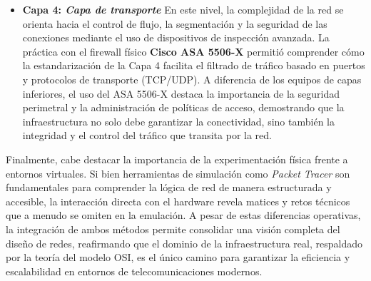 \begin{itemize}
\item \textbf{Capa 4: \textit{Capa de transporte}}
    \newline
    En este nivel, la complejidad de la red se orienta hacia el control de flujo, la segmentación y la seguridad de las conexiones mediante el uso de dispositivos de inspección avanzada. La práctica con el firewall físico \textbf{Cisco ASA 5506-X} permitió comprender cómo la estandarización de la Capa 4 facilita el filtrado de tráfico basado en puertos y protocolos de transporte (TCP/UDP). A diferencia de los equipos de capas inferiores, el uso del ASA 5506-X destaca la importancia de la seguridad perimetral y la administración de políticas de acceso, demostrando que la infraestructura no solo debe garantizar la conectividad, sino también la integridad y el control del tráfico que transita por la red.
\end{itemize}

\medskip
Finalmente, cabe destacar la importancia de la experimentación física frente a entornos virtuales. Si bien herramientas de simulación como \textit{Packet Tracer} son fundamentales para comprender la lógica de red de manera estructurada y accesible, la interacción directa con el hardware revela matices y retos técnicos que a menudo se omiten en la emulación. A pesar de estas diferencias operativas, la integración de ambos métodos permite consolidar una visión completa del diseño de redes, reafirmando que el dominio de la infraestructura real, respaldado por la teoría del modelo OSI, es el único camino para garantizar la eficiencia y escalabilidad en entornos de telecomunicaciones modernos.
